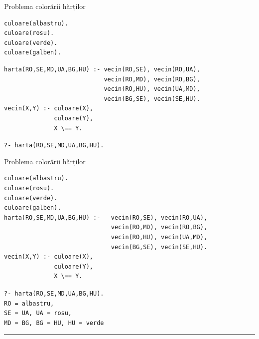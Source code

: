 \documentclass[xcolor=x11names,compress,10pt]{beamer}
\begin{document}
\addtocounter{framenumber}{-1}
\begin{frame}[fragile]{Problema colorării hărților}

\vspace{.4cm}

\begin{example}
\vspace{-.3cm}
\begin{verbatim}
culoare(albastru).
culoare(rosu).
culoare(verde).
culoare(galben).
\end{verbatim}

\vspace{-.3cm}
\begin{verbatim}
harta(RO,SE,MD,UA,BG,HU) :- vecin(RO,SE), vecin(RO,UA), 
                            vecin(RO,MD), vecin(RO,BG),                      	                         
                            vecin(RO,HU), vecin(UA,MD),
                            vecin(BG,SE), vecin(SE,HU).
vecin(X,Y) :- culoare(X), 
              culoare(Y), 
              X \== Y.                      
\end{verbatim}

{\color{blue}\texttt{?- harta(RO,SE,MD,UA,BG,HU).}}


\end{example}

\end{frame}

\addtocounter{framenumber}{-1}
\begin{frame}[fragile]{Problema colorării hărților}

\bigskip

\begin{example}
\vspace{-.3cm}
\begin{verbatim}
culoare(albastru).
culoare(rosu).
culoare(verde).
culoare(galben).
harta(RO,SE,MD,UA,BG,HU) :-   vecin(RO,SE), vecin(RO,UA), 
                              vecin(RO,MD), vecin(RO,BG),                      	                          
                              vecin(RO,HU), vecin(UA,MD),
                              vecin(BG,SE), vecin(SE,HU).
vecin(X,Y) :- culoare(X), 
              culoare(Y), 
              X \== Y.                      
\end{verbatim}

\vspace{-.2cm}
{\color{blue}\texttt{?- harta(RO,SE,MD,UA,BG,HU).\\
RO = albastru,\\
SE = UA, UA = rosu,\\
MD = BG, BG = HU, HU = verde}} \rule{0.6ex}{1.3ex}

\end{example}

\end{frame}
\end{document}
